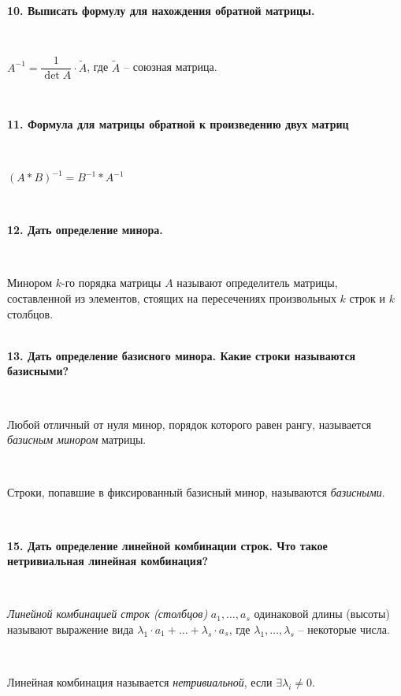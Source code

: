 \documentclass{article}
\begin{document}
    \textbf{10. Выписать формулу для нахождения обратной матрицы.}

    {
        $\;$
        \setlength{\parindent}{0.4cm}
        \hangindent=0.4cm

        $A^{-1}=\dfrac{1}{\det A}\cdot \tilde A$, где $\tilde A$ -- союзная матрица.

        $\;$
        \setlength{\parindent}{0cm}
        \hangindent=0cm
    }

    \textbf{11. Формула для матрицы обратной к произведению двух матриц}

    {
        $\;$
        \setlength{\parindent}{0.4cm}
        \hangindent=0.4cm

        $(A*B)^{-1} = B^{-1} * A^{-1}$

        $\;$
        \setlength{\parindent}{0cm}
        \hangindent=0cm
    }

    \textbf{12. Дать определение минора.}

    {
        $\;$
        \setlength{\parindent}{0.4cm}
        \hangindent=0.4cm

    Минором $k$-го порядка матрицы $A$ называют определитель матрицы, составленной из элементов, стоящих на пересечениях произвольных $k$ строк и $k$ столбцов.\\

        $\;$
        \setlength{\parindent}{0cm}
        \hangindent=0cm
    }

    \textbf{13. Дать определение базисного минора. Какие строки называются базисными?}

    {
        $\;$
        \setlength{\parindent}{0.4cm}
        \hangindent=0.4cm

    Любой отличный от нуля минор, порядок которого равен рангу, называется \textit{базисным минором} матрицы.

        $\;$

        Строки, попавшие в фиксированный базисный минор, называются \textit{базисными}.

        $\;$
        \setlength{\parindent}{0cm}
        \hangindent=0cm
    }

    \textbf{15. Дать определение линейной комбинации строк. Что такое нетривиальная линейная комбинация?}

    {
        $\;$
        \setlength{\parindent}{0.4cm}
        \hangindent=0.4cm

    \textit{Линейной комбинацией строк (столбцов)} $a_1, \ldots, a_s$ одинаковой длины (высоты) называют выражение вида $\lambda_1\cdot a_1+\ldots+\lambda_s\cdot a_s$, где $\lambda_1, \ldots, \lambda_s$ -- некоторые числа.

        $\;$

        Линейная комбинация называется \textit{нетривиальной}, если $\exists \lambda_i\ne 0$.

        $\;$
        \setlength{\parindent}{0cm}
        \hangindent=0cm
    }
\end{document}
